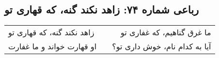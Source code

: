 \begin{center}
\section*{رباعی شماره ۷۴: زاهد نکند گنه، که قهاری تو}
\label{sec:074}
\begin{longtable}{l p{0.5cm} r}
زاهد نکند گنه، که قهاری تو
&&
ما غرق گناهیم، که غفاری تو
\\
او قهارت خواند و ما غفارت
&&
آیا به کدام نام، خوش داری تو؟
\\
\end{longtable}
\end{center}
